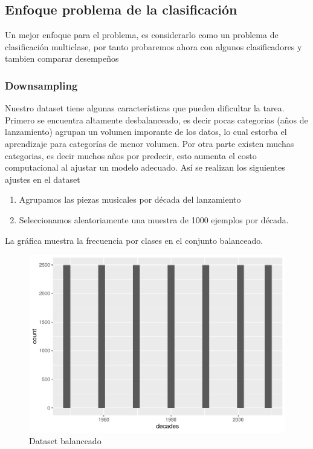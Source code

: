 \documentclass[conference,final,]{IEEEtran}
\providecommand{\tightlist}{%
  \setlength{\itemsep}{0pt}\setlength{\parskip}{0pt}}
\begin{document}
\hypertarget{enfoque-problema-de-la-clasificacion}{%
\subsection{Enfoque problema de la
clasificación}\label{enfoque-problema-de-la-clasificacion}}

Un mejor enfoque para el problema, es considerarlo como un problema de
clasificación multiclase, por tanto probaremos ahora con algunos
clasificadores y tambien comparar desempeños

\hypertarget{downsampling}{%
\subsubsection{Downsampling}\label{downsampling}}

Nuestro dataset tiene algunas características que pueden dificultar la
tarea. Primero se encuentra altamente desbalanceado, es decir pocas
categorias (años de lanzamiento) agrupan un volumen imporante de los
datos, lo cual estorba el aprendizaje para categorías de menor volumen.
Por otra parte existen muchas categorias, es decir muchos años por
predecir, esto aumenta el costo computacional al ajustar un modelo
adecuado. Así se realizan los siguientes ajustes en el dataset

\begin{enumerate}
\def\labelenumi{\arabic{enumi}.}
\tightlist
\item
  Agrupamos las piezas musicales por década del lanzamiento
\item
  Seleccionamos aleatoriamente una muestra de 1000 ejemplos por década.
\end{enumerate}

La gráfica muestra la frecuencia por clases en el conjunto balanceado.

\begin{figure}[H]

{\centering \includegraphics[width=0.6\linewidth]{YearPrediction_Reporte_files/figure-latex/unnamed-chunk-12-1} 

}

\caption{Dataset balanceado}\label{fig:unnamed-chunk-12}
\end{figure}
\end{document}
